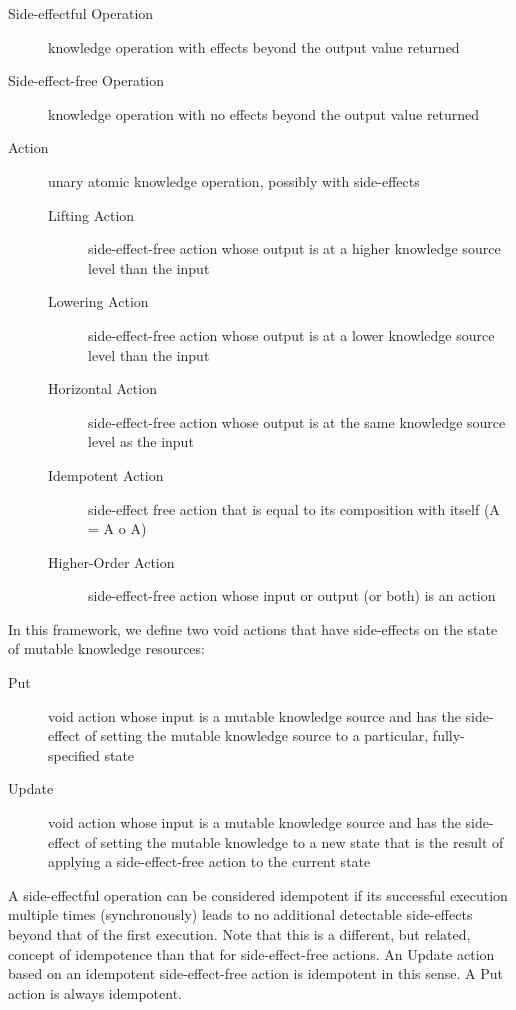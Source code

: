 \documentclass[runningheads]{llncs}
\begin{document}
\begin{description}
    \item[Side-effectful Operation] knowledge operation with effects beyond the output value returned
    \item[Side-effect-free Operation] knowledge operation with no effects beyond the output value returned
    \item[Action] unary atomic knowledge operation, possibly with side-effects
    \begin{description}
      \item[Lifting Action] side-effect-free action whose output is at a higher knowledge source level than the input
      \item[Lowering Action]  side-effect-free action whose output is at a lower knowledge source level than the input
      \item[Horizontal Action] side-effect-free action whose output is at the same knowledge source level as the input
      \item[Idempotent Action] side-effect free action that is equal to its composition with itself (A = A o A)
      \item[Higher-Order Action] side-effect-free action whose input or output (or both) is an action
    \end{description}
\end{description}

In this framework, we define two void actions that have side-effects on the state of mutable knowledge resources:
  \begin{description}
    \item[Put] void action whose input is a mutable knowledge source and has the side-effect of setting the mutable knowledge source to a particular, fully-specified state
    \item[Update] void action whose input is a mutable knowledge source and has the side-effect of setting the mutable knowledge to a new state that is the result of applying a side-effect-free action to the current state
  \end{description}
  
  A side-effectful operation can be considered idempotent if its successful execution multiple times (synchronously) leads to no additional detectable side-effects beyond that of the first execution. Note that this is a different, but related, concept of idempotence than that for side-effect-free actions. An Update action based on an idempotent side-effect-free action is idempotent in this sense. A Put action is always idempotent.
\end{document}
